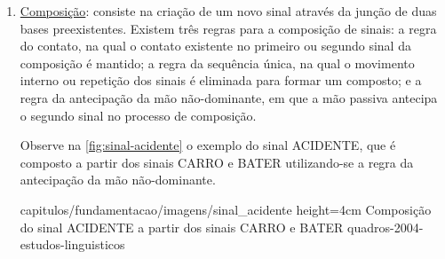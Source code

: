 \begin{enumerate}
\begin{enumerate}
              \item \underline{Composição}: consiste na criação de um novo sinal através da junção de duas bases preexistentes.
                    Existem três regras para a composição de sinais: a regra do contato, na qual o contato existente no primeiro ou segundo sinal da composição é mantido; a regra da sequência única, na qual o movimento interno ou repetição dos sinais é eliminada para formar um composto; e a regra da antecipação da mão não-dominante, em que a mão passiva antecipa o segundo sinal no processo de composição.

                    Observe na \autoref{fig:sinal-acidente} o exemplo do sinal ACIDENTE, que é composto a partir dos sinais CARRO e BATER utilizando-se a regra da antecipação da mão não-dominante.



                    {capitulos/fundamentacao/imagens/sinal_acidente} %
                    {height=4cm} %
                    {Composição do sinal ACIDENTE a partir dos sinais CARRO e BATER} %
                    {quadros-2004-estudos-linguisticos} %






\end{enumerate}
\end{enumerate}
